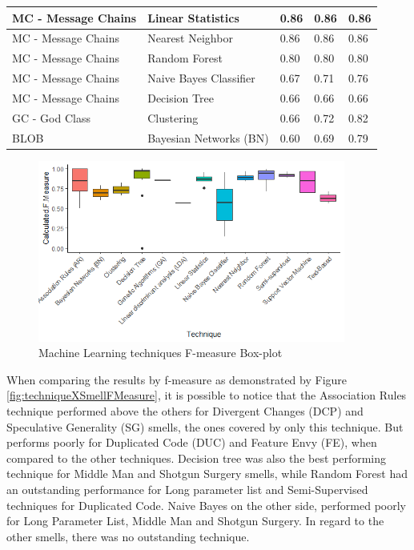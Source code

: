 \begin{small}
\begin{longtable} {|l|l|l|l|l|}
MC - Message Chains          & Linear Statistics      & 0.86  & 0.86   & 0.86  \\ \hline
MC - Message Chains          & Nearest Neighbor       & 0.86  & 0.86   & 0.86  \\ \hline
MC - Message Chains          & Random Forest          & 0.80  & 0.80   & 0.80  \\ \hline
MC - Message Chains          & Naive Bayes Classifier & 0.67  & 0.71   & 0.76  \\ \hline
MC - Message Chains          & Decision Tree          & 0.66  & 0.66   & 0.66  \\ \hline\hline

GC - God Class               & Clustering             & 0.66  & 0.72   & 0.82  \\ \hline\hline

BLOB                         & Bayesian Networks (BN) & 0.60  & 0.69   & 0.79  \\ \hline\hline
\end{longtable}

\end{small}

\begin{figure}[!ht] 
    \centering
	\caption{Machine Learning techniques F-measure Box-plot}
	\label{fig:fmeasureByTechniques}
	\includegraphics[width=0.9\textwidth]{imagens/fmeasureByTechniques.png}
\end{figure}

When comparing the results by f-measure as demonstrated by Figure \ref{fig:techniqueXSmellFMeasure}, it is possible to notice that the Association Rules technique performed above the others for Divergent Changes (DCP) and Speculative Generality (SG) smells, the ones covered by only this technique. But performs poorly for Duplicated Code (DUC) and Feature Envy (FE), when compared to the other techniques. Decision tree was also the best performing technique for Middle Man and Shotgun Surgery smells, while Random Forest had an outstanding performance for Long parameter list and Semi-Supervised techniques for Duplicated Code. Naive Bayes on the other side, performed poorly for Long Parameter List, Middle Man and Shotgun Surgery. In regard to the other smells, there was no outstanding technique.

